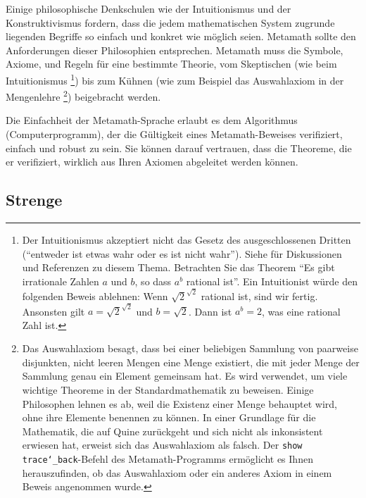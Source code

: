 Einige philosophische Denkschulen wie der Intuitionismus und der Konstruktivismus fordern, dass die jedem mathematischen System zugrunde liegenden Begriffe so einfach und konkret wie möglich seien.  Metamath sollte den Anforderungen dieser Philosophien entsprechen.  Metamath muss die Symbole, Axiome, und Regeln für eine bestimmte Theorie, vom Skeptischen (wie beim Intuitionismus
\footnote{Der Intuitionismus akzeptiert nicht das Gesetz des ausgeschlossenen Dritten ("`entweder ist etwas wahr oder es ist nicht wahr"').  Siehe \cite[S.~xi]{Tymoczko} für Diskussionen und Referenzen zu diesem Thema.  Betrachten Sie das Theorem "`Es gibt irrationale Zahlen $a$ und $b$, so dass $a^b$ rational ist"'.  Ein Intuitionist würde den folgenden Beweis ablehnen:  Wenn $\sqrt{2}^{\sqrt{2}}$ rational ist, sind wir fertig.  Ansonsten gilt $a=\sqrt{2}^{\sqrt{2}}$ und $b=\sqrt{2}$. Dann ist $a^b=2$, was eine rational Zahl ist.})
bis zum Kühnen (wie zum Beispiel das Auswahlaxiom in der Mengenlehre
\footnote{Das Auswahlaxiom besagt, dass bei einer beliebigen Sammlung von paarweise disjunkten, nicht leeren Mengen eine Menge existiert, die mit jeder Menge der Sammlung genau ein Element gemeinsam hat.  Es wird verwendet, um viele wichtige Theoreme in der Standardmathematik zu beweisen.  Einige Philosophen lehnen es ab, weil die Existenz einer Menge behauptet wird, ohne ihre Elemente benennen zu können\cite[S.~154]{Enderton}.  In einer Grundlage für die Mathematik, die auf Quine zurückgeht und sich nicht als inkonsistent erwiesen hat, erweist sich das Auswahlaxiom als falsch\cite[S.~23]{Curry}.  Der \texttt{show trace{\char`\_}back}-Befehl des Metamath-Programms ermöglicht es Ihnen herauszufinden, ob das Auswahlaxiom oder ein anderes Axiom in einem Beweis angenommen wurde.}) beigebracht werden.
	
Die Einfachheit der Metamath-Sprache erlaubt es dem Algorithmus (Computerprogramm),
der die Gültigkeit eines Metamath-Beweises verifiziert, einfach und
robust zu sein.  Sie können darauf vertrauen, dass die Theoreme, die er verifiziert, wirklich aus Ihren Axiomen abgeleitet werden können.

\subsection{Strenge}

